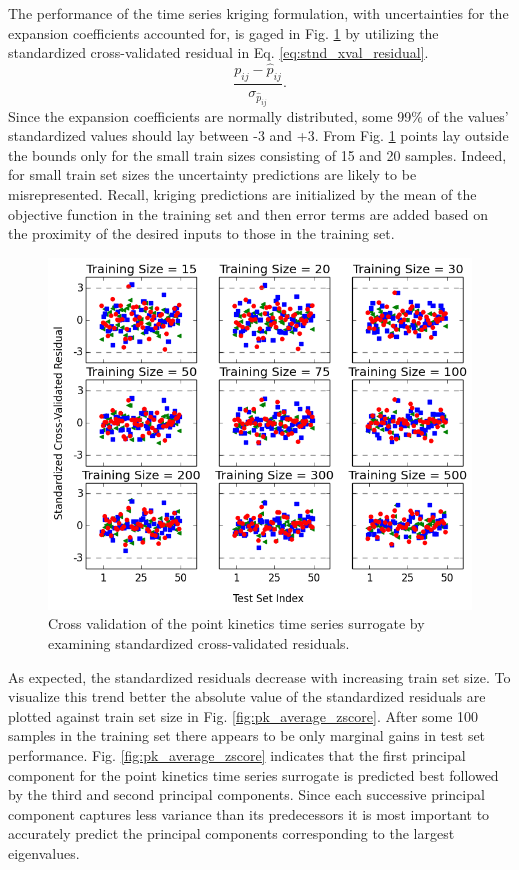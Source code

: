 The performance of the time series kriging formulation, with uncertainties for the expansion coefficients accounted for, is gaged in Fig. \ref{fig:pk_stdzd_xval_residuals} by utilizing the standardized cross-validated residual in Eq. \ref{eq:stnd_xval_residual}.   
\begin{equation}
\label{eq:stnd_xval_residual}
 \frac{ p_{ij} - \hat{p}_{ij} }{ \sigma_{\hat{p}_{ij}} } . 
\end{equation}  
Since the expansion coefficients are normally distributed, some 99\% of the values' standardized values should lay between -3 and +3. From Fig. \ref{fig:pk_stdzd_xval_residuals} points lay outside the bounds only for the small train sizes consisting of 15 and 20 samples. Indeed, for small train set sizes the uncertainty predictions are likely to be misrepresented. Recall, kriging predictions are initialized by the mean of the objective function in the training set and then error terms are added based on the proximity of the desired inputs to those in the training set.  
\begin{figure}[!h]
\caption{\label{fig:pk_stdzd_xval_residuals}
Cross validation of the point kinetics time series surrogate by examining standardized cross-validated residuals.}
 \begin{center}
  \includegraphics[scale=.7]{./Chapter4/pk_stdzd_xval_residuals.png}
 \end{center}
\end{figure} 
As expected, the standardized residuals decrease with increasing train set size. To visualize this trend better the absolute value of the standardized residuals are plotted against train set size in Fig. \ref{fig:pk_average_zscore}. After some 100 samples in the training set there appears to be only marginal gains in test set performance. Fig. \ref{fig:pk_average_zscore} indicates that the first principal component for the point kinetics time series surrogate is predicted best followed by the third and second principal components. Since each successive principal component captures less variance than its predecessors it is most important to accurately predict the principal components corresponding to the largest eigenvalues. 
